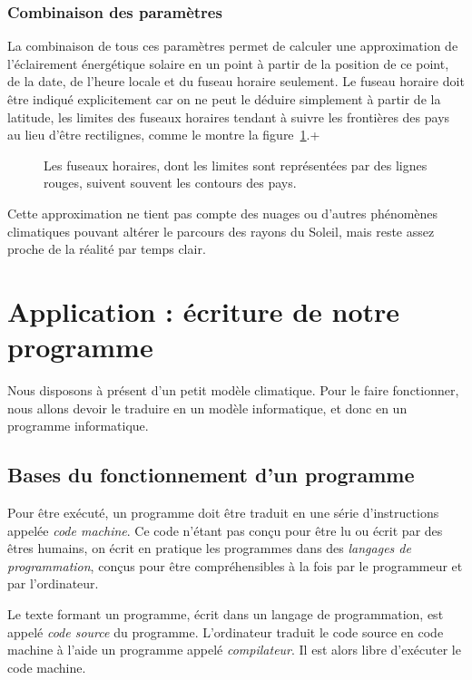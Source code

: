 \documentclass[12pt]{article}
\begin{document}
\subsubsection{Combinaison des paramètres}
La combinaison de tous ces paramètres permet de calculer une approximation de l'éclairement énergétique solaire en un point à partir de la position de ce point, de la date, de l'heure locale et du fuseau horaire seulement.
Le fuseau horaire doit être indiqué explicitement car on ne peut le déduire simplement à partir de la latitude, les limites des fuseaux horaires tendant à suivre les frontières des pays au lieu d'être rectilignes, comme le montre la figure~\ref{fig:timezones}.+

\begin{figure}[!ht]
  \centering
  \caption{Les fuseaux horaires, dont les limites sont représentées par des lignes rouges, suivent souvent les contours des pays.}
  \label{fig:timezones}
\end{figure}

Cette approximation ne tient pas compte des nuages ou d'autres phénomènes climatiques pouvant altérer le parcours des rayons du Soleil, mais reste assez proche de la réalité par temps clair.


\clearpage
\section{Application : écriture de notre programme}

Nous disposons à présent d'un petit modèle climatique.
Pour le faire fonctionner, nous allons devoir le traduire en un modèle informatique, et donc en un programme informatique.

\subsection{Bases du fonctionnement d'un programme}

Pour être exécuté, un programme doit être traduit en une série d'instructions appelée \emph{code machine}.
Ce code n'étant pas conçu pour être lu ou écrit par des êtres humains, on écrit en pratique les programmes dans des \emph{langages de programmation}, conçus pour être compréhensibles à la fois par le programmeur et par l'ordinateur.

Le texte formant un programme, écrit dans un langage de programmation, est appelé \emph{code source} du programme.
L'ordinateur traduit le code source en code machine à l'aide un programme appelé \emph{compilateur}.
Il est alors libre d'exécuter le code machine.
\end{document}
